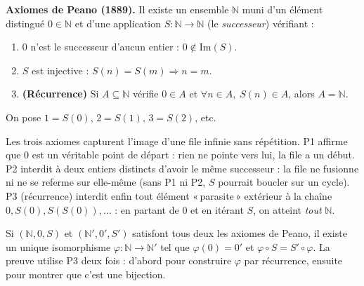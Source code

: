 ﻿%



\begin{tcolorbox}[thmbox]
  \textbf{Axiomes de Peano (1889).}\enspace%
  Il existe un ensemble $\mathbb{N}$ muni d'un élément distingué $0 \in \mathbb{N}$
  et d'une application $S : \mathbb{N} \to \mathbb{N}$ (le \emph{successeur}) vérifiant :
  \begin{enumerate}
    \item[\textbf{P1.}] $0$ n'est le successeur d'aucun entier : $0 \notin \mathrm{Im}(S)$.
    \item[\textbf{P2.}] $S$ est injective : $S(n) = S(m) \Rightarrow n = m$.
    \item[\textbf{P3.}] \textbf{(Récurrence)} Si $A \subseteq \mathbb{N}$ vérifie
      $0 \in A$ et $\forall n \in A,\; S(n) \in A$, alors $A = \mathbb{N}$.
  \end{enumerate}
  On pose $1 = S(0)$, $2 = S(1)$, $3 = S(2)$, etc.
\end{tcolorbox}

\begin{significationintuitive}
  Les trois axiomes capturent l'image d'une file infinie sans répétition.
  P1 affirme que $0$ est un véritable point de départ : rien ne pointe vers lui,
  la file a un début. P2 interdit à deux entiers distincts d'avoir le même
  successeur : la file ne fusionne ni ne se referme sur elle-même (sans P1 ni P2,
  $S$ pourrait boucler sur un cycle). P3 (récurrence) interdit enfin tout élément
  «\,parasite\,» extérieur à la chaîne $0, S(0), S(S(0)), \ldots$ : en partant de
  $0$ et en itérant $S$, on atteint \emph{tout} $\mathbb{N}$.
\end{significationintuitive}

Si $(\mathbb{N}, 0, S)$ et $(\mathbb{N}', 0', S')$ satisfont tous deux les axiomes
de Peano, il existe un unique isomorphisme $\varphi : \mathbb{N} \to \mathbb{N}'$
tel que $\varphi(0) = 0'$ et $\varphi \circ S = S' \circ \varphi$.
La preuve utilise P3 deux fois : d'abord pour construire $\varphi$ par récurrence,
ensuite pour montrer que c'est une bijection.

